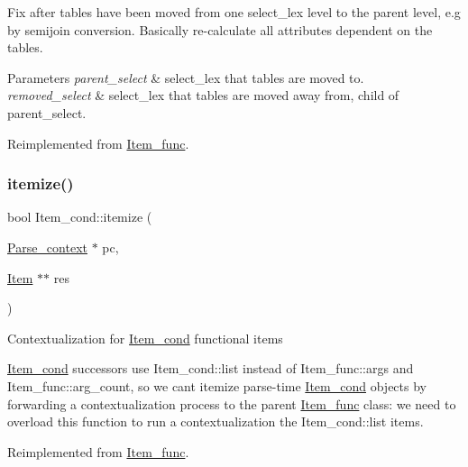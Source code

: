 Fix after tables have been moved from one select\+\_\+lex level to the parent level, e.\+g by semijoin conversion. Basically re-\/calculate all attributes dependent on the tables.


\begin{DoxyParams}{Parameters}
{\em parent\+\_\+select} & select\+\_\+lex that tables are moved to. \\
\hline
{\em removed\+\_\+select} & select\+\_\+lex that tables are moved away from, child of parent\+\_\+select. \\
\hline
\end{DoxyParams}


Reimplemented from \mbox{\hyperlink{classItem__func_ab2b8cc7a3bf580679718da7e99e3e8d9}{Item\+\_\+func}}.

\mbox{\label{classItem__cond_a188060057f9f212bd0946f952b276555}} 
\subsubsection{\texorpdfstring{itemize()}{itemize()}}
{\footnotesize\ttfamily bool Item\+\_\+cond\+::itemize (\begin{DoxyParamCaption}\item[{\mbox{\hyperlink{structParse__context}{Parse\+\_\+context}} $\ast$}]{pc,  }\item[{\mbox{\hyperlink{classItem}{Item}} $\ast$$\ast$}]{res }\end{DoxyParamCaption})\hspace{0.3cm}{\ttfamily [virtual]}}

Contextualization for \mbox{\hyperlink{classItem__cond}{Item\+\_\+cond}} functional items

\mbox{\hyperlink{classItem__cond}{Item\+\_\+cond}} successors use Item\+\_\+cond\+::list instead of Item\+\_\+func\+::args and Item\+\_\+func\+::arg\+\_\+count, so we can\textquotesingle{}t itemize parse-\/time \mbox{\hyperlink{classItem__cond}{Item\+\_\+cond}} objects by forwarding a contextualization process to the parent \mbox{\hyperlink{classItem__func}{Item\+\_\+func}} class\+: we need to overload this function to run a contextualization the Item\+\_\+cond\+::list items. 

Reimplemented from \mbox{\hyperlink{classItem__func_a6413cdbe7b14be77cc47462c9fc87ddb}{Item\+\_\+func}}.

\mbox{\label{classItem__cond_ac31bdc524e6febf5e6b1ac0874064400}} 
